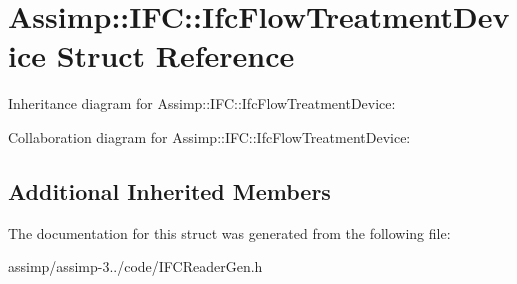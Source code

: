 \hypertarget{struct_assimp_1_1_i_f_c_1_1_ifc_flow_treatment_device}{\section{Assimp\+:\+:I\+F\+C\+:\+:Ifc\+Flow\+Treatment\+Device Struct Reference}
\label{struct_assimp_1_1_i_f_c_1_1_ifc_flow_treatment_device}
}


Inheritance diagram for Assimp\+:\+:I\+F\+C\+:\+:Ifc\+Flow\+Treatment\+Device\+:


Collaboration diagram for Assimp\+:\+:I\+F\+C\+:\+:Ifc\+Flow\+Treatment\+Device\+:
\subsection*{Additional Inherited Members}


The documentation for this struct was generated from the following file\+:\begin{DoxyCompactItemize}
\item 
assimp/assimp-\/3../code/I\+F\+C\+Reader\+Gen.\+h\end{DoxyCompactItemize}
